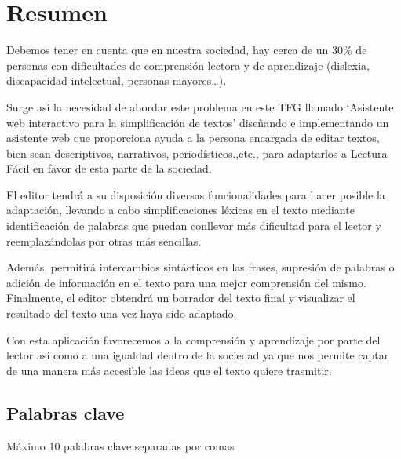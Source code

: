 \chapter*{Resumen}

Debemos tener en cuenta que en nuestra sociedad, hay cerca de un 30\% de personas con dificultades de comprensión lectora y de aprendizaje (dislexia, discapacidad intelectual, personas mayores…). 


Surge así la necesidad de abordar este problema en este TFG llamado ‘Asistente web interactivo para la simplificación de textos’ diseñando e implementando un asistente web que proporciona ayuda a la persona encargada de editar textos, bien sean descriptivos, narrativos, periodísticos.,etc.,  para adaptarlos a Lectura Fácil en favor de esta parte de la sociedad. 


El editor tendrá a su disposición diversas funcionalidades para hacer posible la adaptación, llevando a cabo simplificaciones léxicas en el texto mediante identificación de palabras que puedan conllevar más dificultad para el lector y reemplazándolas por otras más sencillas.


 Además, permitirá intercambios sintácticos en las frases, supresión de palabras o adición de información en el texto para una mejor comprensión del mismo. Finalmente, el editor obtendrá un borrador del texto final y visualizar el resultado del texto una vez haya sido adaptado.


Con esta aplicación favorecemos a la comprensión y aprendizaje por parte del lector así como a una igualdad dentro de la sociedad ya que nos permite captar de una manera más accesible las ideas que el texto quiere trasmitir.



\section*{Palabras clave}
   
\noindent Máximo 10 palabras clave separadas por comas

   


